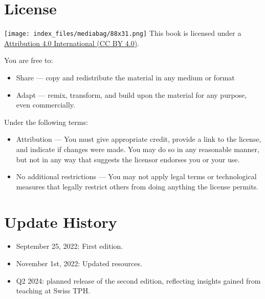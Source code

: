 \documentclass[
  letterpaper,
  DIV=11,
  numbers=noendperiod,
  oneside]{scrreprt}
\providecommand{\tightlist}{%
  \setlength{\itemsep}{0pt}\setlength{\parskip}{0pt}}\usepackage{longtable,booktabs,array}
\begin{document}
\hypertarget{license}{%
\section*{License}\label{license}}


\texttt{[image: index\_files/mediabag/88x31.png]} This book is licensed
under a \href{https://creativecommons.org/licenses/by/4.0/}{Attribution
4.0 International (CC BY 4.0)}.

You are free to:

\begin{itemize}
\tightlist
\item
  Share --- copy and redistribute the material in any medium or format
\item
  Adapt --- remix, transform, and build upon the material for any
  purpose, even commercially.
\end{itemize}

Under the following terms:

\begin{itemize}
\tightlist
\item
  Attribution --- You must give appropriate credit, provide a link to
  the license, and indicate if changes were made. You may do so in any
  reasonable manner, but not in any way that suggests the licensor
  endorses you or your use.
\item
  No additional restrictions --- You may not apply legal terms or
  technological measures that legally restrict others from doing
  anything the license permits.
\end{itemize}

\hypertarget{update-history}{%
\section*{Update History}\label{update-history}}


\begin{itemize}
\tightlist
\item
  September 25, 2022: First edition.
\item
  November 1st, 2022: Updated resources.
\item
  Q2 2024: planned release of the second edition, reflecting insights
  gained from teaching at Swiss TPH.
\end{itemize}
\end{document}
